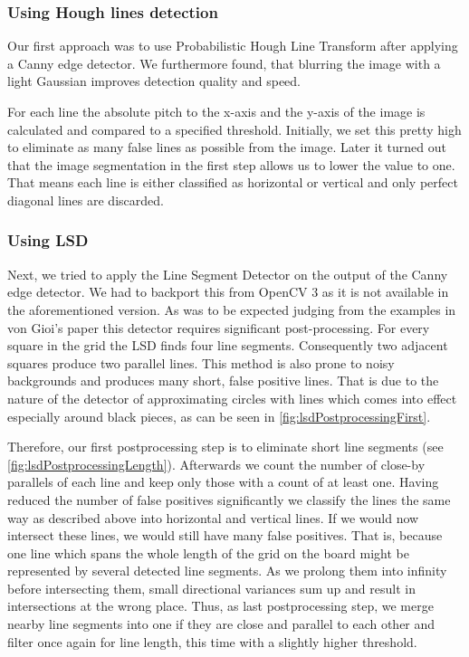 	\subsubsection{Using Hough lines detection}
	\label{detector-visible-hough}
	Our first approach was to use Probabilistic Hough Line Transform after applying a Canny edge detector. We furthermore found, that blurring the image with a light Gaussian improves detection quality and speed.

	For each line the absolute pitch to the x-axis and the y-axis of the image is calculated and compared to a specified threshold. Initially, we set this pretty high to eliminate as many false lines as possible from the image. Later it turned out that the image segmentation in the first step allows us to lower the value to one. That means each line is either classified as horizontal or vertical and only perfect diagonal lines are discarded.

	\subsubsection{Using LSD}
	\label{detector-visible-lsd}
	Next, we tried to apply the Line Segment Detector \cite{von2012lsd} on the output of the Canny edge detector. We had to backport this from OpenCV 3 as it is not available in the aforementioned version. As was to be expected judging from the examples in von Gioi's paper this detector requires significant post-processing. For every square in the grid the LSD finds four line segments. Consequently two adjacent squares produce two parallel lines. This method is also prone to noisy backgrounds and produces many short, false positive lines. That is due to the nature of the detector of approximating circles with lines which comes into effect especially around black pieces, as can be seen in \autoref{fig:lsdPostprocessingFirst}.

	Therefore, our first postprocessing step is to eliminate short line segments (see \autoref{fig:lsdPostprocessingLength}). Afterwards we count the number of close-by parallels of each line and keep only those with a count of at least one. Having reduced the number of false positives significantly we classify the lines the same way as described above into horizontal and vertical lines. If we would now intersect these lines, we would still have many false positives. That is, because one line which spans the whole length of the grid on the board might be represented by several detected line segments. As we prolong them into infinity before intersecting them, small directional variances sum up and result in intersections at the wrong place. Thus, as last postprocessing step, we merge nearby line segments into one if they are close and parallel to each other and filter once again for line length, this time with a slightly higher threshold.

